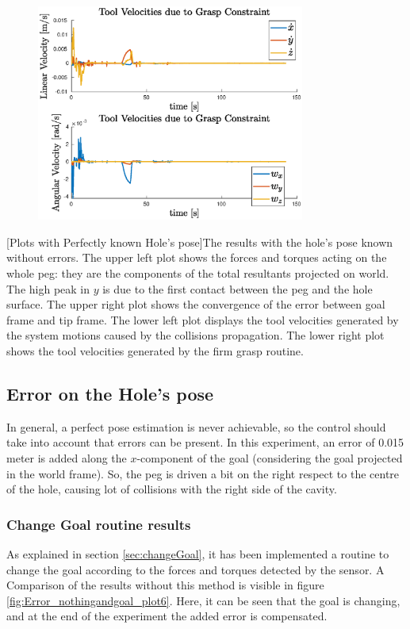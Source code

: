 \begin{figure}[H]
{		\includegraphics[width=8.8cm]{NOERROR/grasp.eps}
	}
\end{figure}
[Plots with Perfectly known Hole's pose]{The results with the hole's pose known without errors. The upper left plot shows the forces and torques acting on the whole peg: they are the components of the total resultants projected on world. The high peak in $y$ is due to the first contact between the peg and the hole surface. The upper right plot shows the convergence of the error between goal frame and tip frame. The lower left plot displays the tool velocities generated by the system motions caused by the collisions propagation. The lower right plot shows the tool velocities generated by the firm grasp routine.}
\label{fig:noErrorPlots}
\vspace{30px}

\subsection{Error on the Hole's pose}
\label{subsec:resultsControlError}
In general, a perfect pose estimation is never achievable, so the control should take into account that errors can be present. In this experiment, an error of 0.015 meter is added along the $x$-component of the goal (considering the goal projected in the world frame). So, the peg is driven a bit on the right respect to the centre of the hole, causing lot of collisions with the right side of the cavity.\\

\subsubsection{Change Goal routine results}
As explained in section \ref{sec:changeGoal}, it has been implemented a routine to change the goal according to the forces and torques detected by the sensor. A Comparison of the results without this method is visible in figure \ref{fig:Error_nothingandgoal_plot6}. Here, it can be seen that the goal is changing, and at the end of the experiment the added error is compensated.

